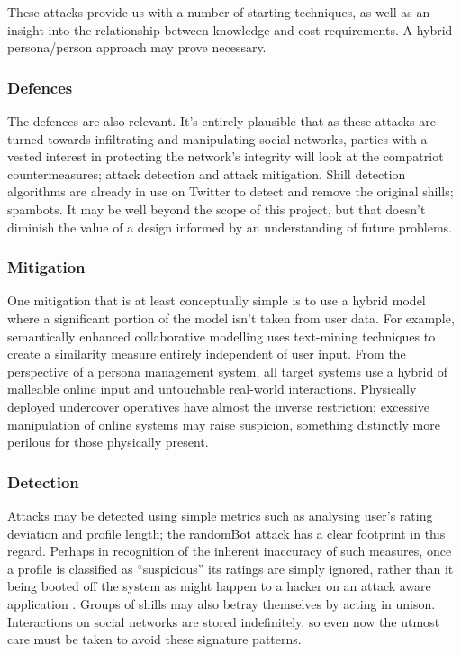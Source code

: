 These attacks provide us with a number of starting techniques, as well as an insight into the relationship between knowledge and cost requirements. A hybrid persona/person approach may prove necessary.

\subsubsection{Defences}

The defences are also relevant. It's entirely plausible that as these attacks
are turned towards infiltrating and manipulating social networks, parties with a
vested interest in protecting the network's integrity will look at the
compatriot countermeasures; attack detection and attack mitigation. Shill
detection algorithms are already in use on Twitter to detect and remove the
original shills; spambots. It may be well beyond the scope of this project, but
that doesn't diminish the value of a design informed by an understanding of
future problems.

\subsubsection{Mitigation}

One mitigation that is at least conceptually simple  is to use a hybrid model
where a significant portion of the model isn't taken from user data. For
example, semantically enhanced collaborative modelling uses text-mining
techniques to create a similarity measure entirely independent of user input.
From the perspective of a persona management system, all target systems use a
hybrid of malleable online input and untouchable real-world interactions.
Physically deployed undercover operatives have almost the inverse restriction;
excessive manipulation of online systems may raise suspicion, something
distinctly more perilous for those physically present.

\subsubsection{Detection}
Attacks may be detected using simple metrics such as analysing user's rating
deviation and profile length; the randomBot attack has a clear footprint in this
regard. Perhaps in recognition of the inherent inaccuracy of such measures, once
a profile is classified as ``suspicious'' its ratings are simply ignored, rather
than it being booted off the system as might happen to a hacker on an attack
aware application \cite{attackAware}. Groups of shills may also betray themselves by acting in unison. Interactions on social networks are stored indefinitely, so even now the utmost care must be taken to avoid these signature patterns.